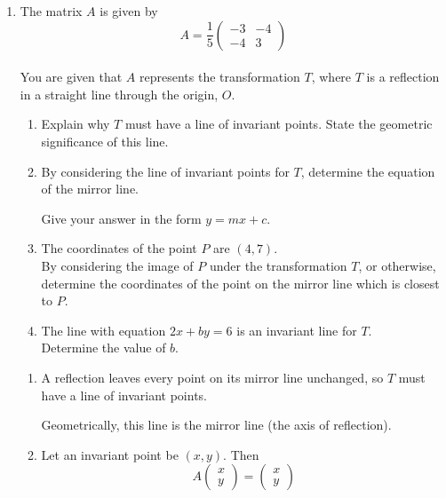 \documentclass[leqno]{article}
\newcommand{\questionitem}{%
  \item\phantomsection
  \addcontentsline{toc}{section}{Question \number\value{enumi}}%
}
\begin{document}
\begin{enumerate}[
  label=\textbf{\arabic*.},
  leftmargin=*,
  topsep=0pt,
  partopsep=0pt,
  parsep=0pt
]
\begin{tcolorbox}[colback=white, colframe=scarlet, title={\textbf{Solution}}, breakable, grow to left by=6mm, grow to right by=10mm]
Equivalently, \(x+2y=0\).
\end{tcolorbox}


\newpage

\questionitem

The matrix $A$ is given by
\[
A = \frac{1}{5}\begin{pmatrix}-3 & -4 \\ -4 & 3\end{pmatrix}
\] \\
You are given that $A$ represents the transformation $T$, where $T$ is a reflection in a straight line through the origin, $O$. \\
\begin{enumerate}[label=\textbf{(\alph*)}]
  \item Explain why $T$ must have a line of invariant points. State the geometric significance of this line.  \\
  \item By considering the line of invariant points for $T$, determine the equation of the mirror line.

Give your answer in the form $y = mx + c$.  \\
  \item The coordinates of the point $P$ are $(4, 7)$. \\
  By considering the image of $P$ under the transformation $T$, or otherwise, determine the coordinates of the point on the mirror line which is closest to $P$.  \\
  \item The line with equation $2x + by = 6$ is an invariant line for $T$. \\
  Determine the value of $b$.  \\
\end{enumerate}

\vspace*{30pt}

\begin{tcolorbox}[colback=white, colframe=scarlet, title={\textbf{Solution}}, breakable, grow to left by=6mm, grow to right by=10mm]
\begin{enumerate}[label=\textbf{(\alph*)}]
  \item A reflection leaves every point on its mirror line unchanged, so $T$ must have a line of invariant points.

  Geometrically, this line is the mirror line (the axis of reflection).

  \item Let an invariant point be $(x,y)$. Then
  \[
  A\begin{pmatrix}x\\y\end{pmatrix}=\begin{pmatrix}x\\y\end{pmatrix}
  \]


\end{enumerate}
\end{tcolorbox}
\end{enumerate}
\end{document}
